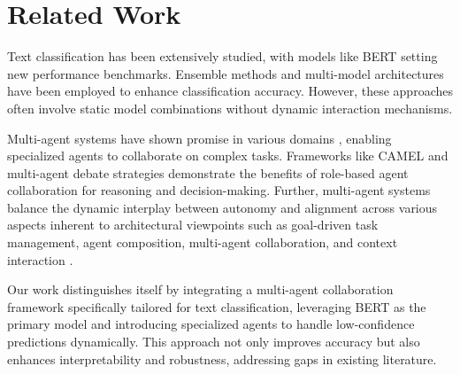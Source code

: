 \section{Related Work}
\label{sec:related_work}

Text classification has been extensively studied, with models like BERT \citep{devlin2019bert,10278387} setting new performance benchmarks. Ensemble methods \citep{dietterich2000ensemble} and multi-model architectures \citep{kim2019bert} have been employed to enhance classification accuracy. However, these approaches often involve static model combinations without dynamic interaction mechanisms.

Multi-agent systems have shown promise in various domains \citep{guo2024largelanguagemodelbased, talebirad2023multiagentcollaborationharnessingpower}, enabling specialized agents to collaborate on complex tasks. Frameworks like CAMEL \citep{li2023camel} and multi-agent debate strategies \citep{du2023improving} demonstrate the benefits of role-based agent collaboration for reasoning and decision-making. Further, multi-agent systems balance the dynamic interplay between autonomy and alignment across various aspects inherent to architectural viewpoints such as goal-driven task management, agent composition, multi-agent collaboration, and context interaction \citep{handler2023taxonomy}. 

Our work distinguishes itself by integrating a multi-agent collaboration framework specifically tailored for text classification, leveraging BERT as the primary model and introducing specialized agents to handle low-confidence predictions dynamically. This approach not only improves accuracy but also enhances interpretability and robustness, addressing gaps in existing literature.